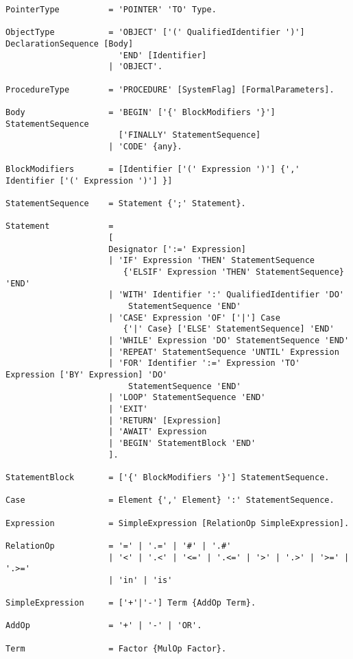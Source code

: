 \documentclass[a4paper,11pt]{article}
\begin{document}
\begin{lstlisting}[language = EBNF, frame=none,xleftmargin=0mm]
PointerType          = 'POINTER' 'TO' Type.

ObjectType           = 'OBJECT' ['(' QualifiedIdentifier ')'] DeclarationSequence [Body]
                       'END' [Identifier]
                     | 'OBJECT'.

ProcedureType        = 'PROCEDURE' [SystemFlag] [FormalParameters].

Body                 = 'BEGIN' ['{' BlockModifiers '}'] StatementSequence
                       ['FINALLY' StatementSequence]
                     | 'CODE' {any}.

BlockModifiers       = [Identifier ['(' Expression ')'] {',' Identifier ['(' Expression ')'] }]

StatementSequence    = Statement {';' Statement}.

Statement            =
                     [
                     Designator [':=' Expression]
                     | 'IF' Expression 'THEN' StatementSequence
                        {'ELSIF' Expression 'THEN' StatementSequence} 'END'
                     | 'WITH' Identifier ':' QualifiedIdentifier 'DO'
                         StatementSequence 'END'
                     | 'CASE' Expression 'OF' ['|'] Case
                        {'|' Case} ['ELSE' StatementSequence] 'END'
                     | 'WHILE' Expression 'DO' StatementSequence 'END'
                     | 'REPEAT' StatementSequence 'UNTIL' Expression
                     | 'FOR' Identifier ':=' Expression 'TO' Expression ['BY' Expression] 'DO'
                         StatementSequence 'END'
                     | 'LOOP' StatementSequence 'END'
                     | 'EXIT'
                     | 'RETURN' [Expression]
                     | 'AWAIT' Expression
                     | 'BEGIN' StatementBlock 'END'
                     ].

StatementBlock       = ['{' BlockModifiers '}'] StatementSequence.

Case                 = Element {',' Element} ':' StatementSequence.

Expression           = SimpleExpression [RelationOp SimpleExpression].

RelationOp           = '=' | '.=' | '#' | '.#'
                     | '<' | '.<' | '<=' | '.<=' | '>' | '.>' | '>=' | '.>='
                     | 'in' | 'is'

SimpleExpression     = ['+'|'-'] Term {AddOp Term}.

AddOp                = '+' | '-' | 'OR'.

Term                 = Factor {MulOp Factor}.


\end{lstlisting}
\end{document}
